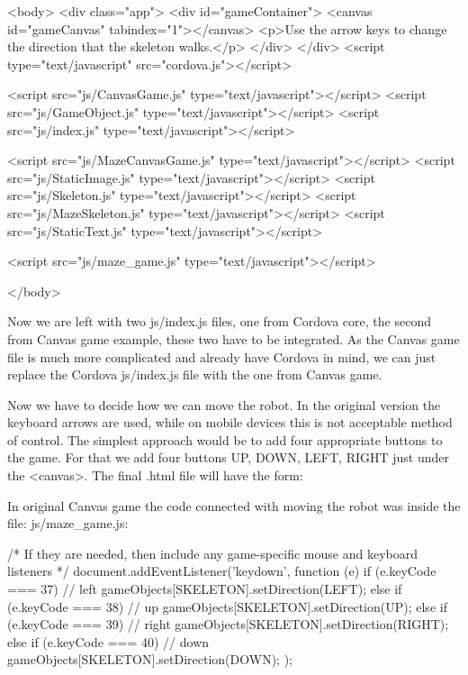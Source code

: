 \begin{html}
<body>
    <div class="app">
        <div id="gameContainer">
           <canvas id="gameCanvas" tabindex="1"></canvas>
           <p>Use the arrow keys to change the direction that the skeleton walks.</p>
        </div>
    </div>
    <script type="text/javascript" src="cordova.js"></script>

    <script src="js/CanvasGame.js" type="text/javascript"></script>
    <script src="js/GameObject.js" type="text/javascript"></script>
    <script src="js/index.js" type="text/javascript"></script>

    <script src="js/MazeCanvasGame.js" type="text/javascript"></script>
    <script src="js/StaticImage.js" type="text/javascript"></script>
    <script src="js/Skeleton.js" type="text/javascript"></script>
    <script src="js/MazeSkeleton.js" type="text/javascript"></script>
    <script src="js/StaticText.js" type="text/javascript"></script>


    <script src="js/maze_game.js" type="text/javascript"></script>

</body>
\end{html}
Now we are left with two js/index.js files, one from Cordova core, the second from Canvas game example, these two have to be integrated. As the Canvas game file is much more complicated and already have Cordova in mind, we can just replace the Cordova js/index.js file with the one from Canvas game.

Now we have to decide how we can move the robot. In the original version the keyboard arrows are used, while on mobile devices this is not acceptable method of control. The simplest approach would be to add four appropriate buttons to the game. For that we add four buttons UP, DOWN, LEFT, RIGHT just under the <canvas>. The final .html file will have the form:


In original Canvas game the code connected with moving the robot was inside the file: js/maze\_game.js:
\begin{js}
/* If they are needed, then include any game-specific mouse and keyboard listeners */
    document.addEventListener('keydown', function (e)
    {
        if (e.keyCode === 37)  // left
        {
            gameObjects[SKELETON].setDirection(LEFT);
        }
        else if (e.keyCode === 38) // up
        {
            gameObjects[SKELETON].setDirection(UP);
        }
        else if (e.keyCode === 39) // right
        {
            gameObjects[SKELETON].setDirection(RIGHT);
        }
        else if (e.keyCode === 40) // down
        {
            gameObjects[SKELETON].setDirection(DOWN);
        }
    });
\end{js}

